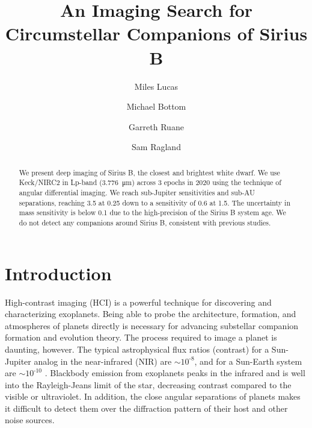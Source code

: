 \documentclass[twocolumn]{aastex631}
\begin{document}
\title{An Imaging Search for Circumstellar Companions of Sirius B}



\author[0000-0001-6341-310X]{Miles Lucas}

\author[0000-0003-1341-5531]{Michael Bottom}

\author[0000-0003-4769-1665]{Garreth Ruane}

\author[0000-0002-0696-1780]{Sam Ragland}


\begin{abstract}
We present deep imaging of Sirius B, the closest and brightest white dwarf. We use Keck/NIRC2 in Lp-band (\qty{3.776}{\micro\meter}) across 3 epochs in 2020 using the technique of angular differential imaging. We reach sub-Jupiter sensitivities and sub-AU separations, reaching \qty{3.5}{\jupitermass} at \qty{0.25}{\au} down to a sensitivity of \qty{0.6}{\jupitermass} at \qty{1.5}{\au}. The uncertainty in mass sensitivity is below \qty{0.1}{\jupitermass} due to the high-precision of the Sirius B system age. We do not detect any companions around Sirius B, consistent with previous studies.
\end{abstract}

\section{Introduction} \label{sec:intro}

High-contrast imaging (HCI) is a powerful technique for discovering and characterizing exoplanets. Being able to probe the architecture, formation, and atmospheres of planets directly is necessary for advancing substellar companion formation and evolution theory. The process required to image a planet is daunting, however. The typical astrophysical flux ratios (contrast) for a Sun-Jupiter analog in the near-infrared (NIR) are $\sim$$10^{\text{-}8}$, and for a Sun-Earth system are $\sim$$10^{\text{-}10}$ \citep{traub_direct_2010}. Blackbody emission from exoplanets peaks in the infrared and is well into the Rayleigh-Jeans limit of the star, decreasing contrast compared to the visible or ultraviolet. In addition, the close angular separations of planets makes it difficult to detect them over the diffraction pattern of their host and other noise sources.
\end{document}
